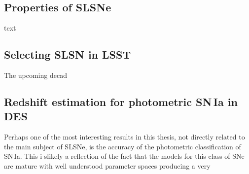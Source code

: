\subsection{Properties of SLSNe}
text

\subsection{Selecting SLSN in LSST}
The upcoming decad

\subsection{Redshift estimation for photometric SN\,Ia in DES}
Perhaps one of the most interesting results in this thesis, not directly related to the main subject of SLSNe, is the accuracy of the photometric classification of SN\,Ia. This i slikely a reflection of the fact that the models for this class of SNe are mature with well understood parameter spaces producing a very
